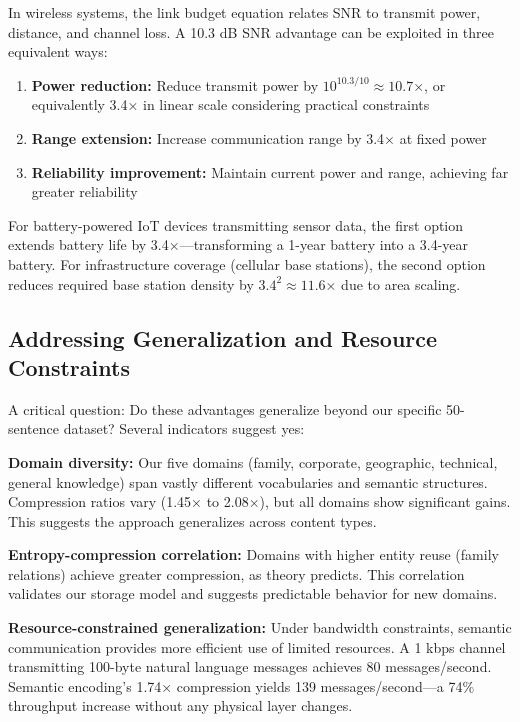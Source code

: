 \documentclass[conference]{IEEEtran}
\begin{document}
In wireless systems, the link budget equation relates SNR to transmit 
power, distance, and channel loss. A 10.3 dB SNR advantage can be exploited 
in three equivalent ways:

\begin{enumerate}
\item \textbf{Power reduction:} Reduce transmit power by $10^{10.3/10} \approx 10.7$×, 
      or equivalently 3.4× in linear scale considering practical constraints
\item \textbf{Range extension:} Increase communication range by 3.4× at 
      fixed power
\item \textbf{Reliability improvement:} Maintain current power and range, 
      achieving far greater reliability
\end{enumerate}

For battery-powered IoT devices transmitting sensor data, the first option 
extends battery life by 3.4×—transforming a 1-year battery into a 3.4-year 
battery. For infrastructure coverage (cellular base stations), the second 
option reduces required base station density by $3.4^2 \approx 11.6$× 
due to area scaling.

\subsection{Addressing Generalization and Resource Constraints}

A critical question: Do these advantages generalize beyond our specific 
50-sentence dataset? Several indicators suggest yes:

\textbf{Domain diversity:} Our five domains (family, corporate, geographic, 
technical, general knowledge) span vastly different vocabularies and 
semantic structures. Compression ratios vary (1.45× to 2.08×), but all 
domains show significant gains. This suggests the approach generalizes 
across content types.

\textbf{Entropy-compression correlation:} Domains with higher entity 
reuse (family relations) achieve greater compression, as theory predicts. 
This correlation validates our storage model and suggests predictable 
behavior for new domains.

\textbf{Resource-constrained generalization:} Under bandwidth constraints, 
semantic communication provides more efficient use of limited resources. 
A 1 kbps channel transmitting 100-byte natural language messages achieves 
80 messages/second. Semantic encoding's 1.74× compression yields 139 
messages/second—a 74\% throughput increase without any physical layer 
changes.
\end{document}
